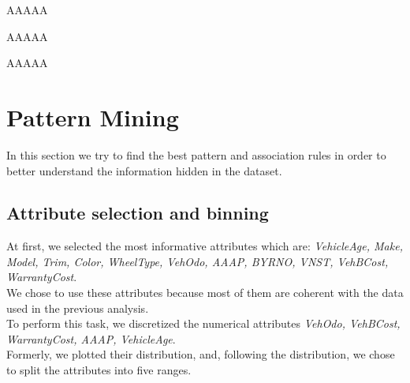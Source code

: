 \documentclass{article}
\begin{document}
	AAAAA
	
	
	AAAAA
	
	
	AAAAA
	
	
	\newpage
	\section{Pattern Mining}
	\label{sec:patternmining}
	In this section we try to find the best pattern and association rules in order to better understand the information hidden in the dataset.
	
	\subsection{Attribute selection and binning}
	
	At first, we selected the most informative attributes which are: \emph{VehicleAge, Make, Model, Trim, Color, WheelType, VehOdo, AAAP, BYRNO, VNST, VehBCost, WarrantyCost}.\\
	We chose to use these attributes because most of them are coherent with the data used in the previous analysis.\\  
	To perform this task, we discretized the numerical attributes \emph{VehOdo, VehBCost, WarrantyCost, AAAP, VehicleAge}.\\
	Formerly, we plotted their distribution, and, following the distribution, we chose to split the attributes into five ranges.\\  
	
\end{document}
